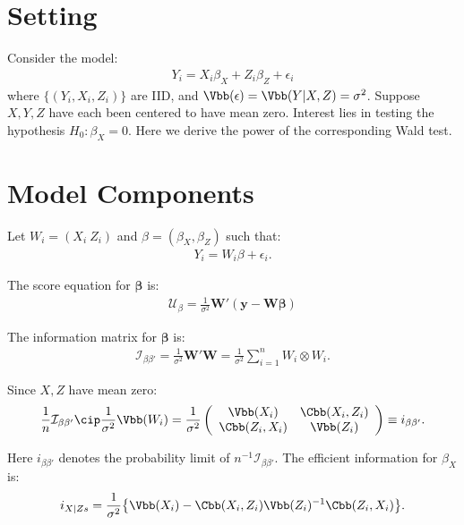 




\section{Setting}
Consider the model:
\begin{align*}
Y_{i} = X_{i}\beta_{X} + Z_{i}\beta_{Z} + \epsilon_{i}
\end{align*}
where $\{(Y_{i}, X_{i}, Z_{i})\}$ are IID, and $\Vbb(\epsilon) = \Vbb(Y|X,Z) = \sigma^2$. Suppose $X, Y, Z$ have each been centered to have mean zero. Interest lies in testing the hypothesis $H_{0}:\beta_{X} = 0$. Here we derive the power of the corresponding Wald test. 

\section{Model Components}
Let $W_{i} = (X_{i}\ Z_{i})$ and $\beta = (\beta_{X}, \beta_{Z})$ such that:
\begin{align*}
Y_{i} = W_{i}\beta + \epsilon_{i}.
\end{align*}

The score equation for $\bm{\beta}$ is:
\begin{align*}
\mathcal{U}_{\beta} = \frac{1}{\sigma^2}\bm{W}'(\bm{y}-\bm{W}\bm{\beta})
\end{align*}

The information matrix for $\bm{\beta}$ is:
\begin{align*}
\mathcal{I}_{\beta\beta'} = \frac{1}{\sigma^2}\bm{W}'\bm{W} = \frac{1}{\sigma^2}\sum_{i=1}^{n}W_{i} \otimes W_{i}.
\end{align*}

Since $X,Z$ have mean zero:
\begin{align*}
\frac{1}{n}\mathcal{I}_{\beta\beta'} \cip \frac{1}{\sigma^2}\Vbb(W_{i}) = \frac{1}{\sigma^2}\left(
\begin{array}{c c}
\Vbb(X_{i}) & \Cbb(X_{i}, Z_{i}) \\
\Cbb(Z_{i}, X_{i}) & \Vbb(Z_{i})
\end{array}
\right) \equiv i_{\beta\beta'}.
\end{align*}

Here $i_{\beta\beta'}$ denotes the probability limit of $n^{-1}\mathcal{I}_{\beta\beta'}$. The efficient information for $\beta_{X}$ is:
\begin{align*}
i_{X|Zs} = \frac{1}{\sigma^2}\big\{\Vbb(X_{i}) - \Cbb(X_{i}, Z_{i})\Vbb(Z_{i})^{-1}\Cbb(Z_{i}, X_{i})\big\}.
\end{align*}

